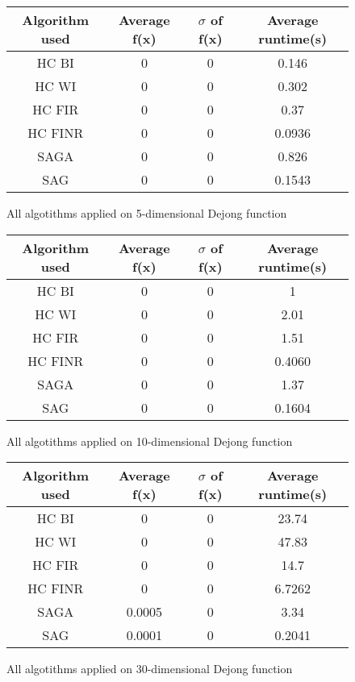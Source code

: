 \documentclass{article}
\begin{document}
\begin{figure}[H]
	\begin{tabular}{|c||c|c|c|} \hline
		Algorithm used & Average f(x) & $\sigma$ of f(x) & Average runtime(s) \\ \hline \hline
		HC BI & 0 & 0 & 0.146 \\ \hline
		HC WI & 0 & 0 & 0.302 \\ \hline
		HC FIR & 0 & 0 & 0.37 \\ \hline
		HC FINR & 0 & 0 & 0.0936 \\ \hline
		SAGA & 0 & 0 & 0.826 \\ \hline
		SAG & 0 & 0 & 0.1543 \\ \hline
\end{tabular}
\caption{All algotithms applied on 5-dimensional Dejong function}
\end{figure}

\begin{figure}[H]
	\begin{tabular}{|c||c|c|c|} \hline
		Algorithm used & Average f(x) & $\sigma$ of f(x) & Average runtime(s) \\ \hline \hline
		HC BI & 0 & 0 & 1 \\ \hline
		HC WI & 0 & 0 & 2.01 \\ \hline
		HC FIR & 0 & 0 & 1.51 \\ \hline
		HC FINR & 0 & 0 & 0.4060 \\ \hline
		SAGA & 0 & 0 & 1.37 \\ \hline
		SAG & 0 & 0 & 0.1604 \\ \hline
\end{tabular}
\caption{All algotithms applied on 10-dimensional Dejong function}
\end{figure}

\begin{figure}[H]
	\begin{tabular}{|c||c|c|c|} \hline
		Algorithm used & Average f(x) & $\sigma$ of f(x) & Average runtime(s) \\ \hline \hline
		HC BI & 0 & 0 & 23.74 \\ \hline
		HC WI & 0 & 0 & 47.83 \\ \hline
		HC FIR & 0 & 0 & 14.7 \\ \hline
		HC FINR & 0 & 0 & 6.7262 \\ \hline
		SAGA & 0.0005 & 0 & 3.34 \\ \hline
		SAG & 0.0001 & 0 & 0.2041 \\ \hline
\end{tabular}
\caption{All algotithms applied on 30-dimensional Dejong function}
\end{figure}
\end{document}
